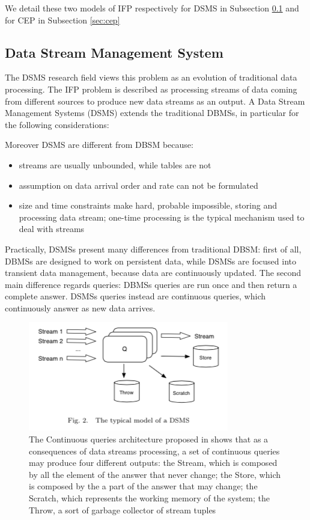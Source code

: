 We detail these two models of IFP respectively for DSMS in Subsection \ref{sec:dsms} and for CEP in Subsection \ref{sec:cep}

\subsection{Data Stream Management System}\label{sec:dsms}
The DSMS research field  views this problem as an evolution of traditional data processing. The IFP problem is described as processing streams of data coming from different sources to produce new data streams as an output. A Data Stream Management Systems (DSMS) extends the traditional DBMSs, in particular for the following considerations:

Moreover DSMS are different from DBSM because: 
\begin{itemize}
\item streams are usually unbounded, while tables are not
\item assumption on data arrival order and rate can not be formulated
\item size and time constraints make hard, probable impossible, storing and processing data stream; one-time processing is the typical mechanism used to deal with streams
\end{itemize} 

Practically, DSMSs present many differences from traditional DBSM: first of all, DBMSs are designed to work on persistent data, while DSMSs are focused into transient data management, because data are continuously updated. The second main difference regards queries: DBMSs queries are run once and then return a complete answer. DSMSs queries instead are continuous queries, which continuously answer as new data arrives. 

\begin{figure}[tbh]
  \centering
	\includegraphics[width=0.75\linewidth]{images/dsms}
	\caption[General Continuous Queries Architecture]{The Continuous queries architecture proposed in \cite{Babu:2001:CQO:603867.603884} shows that as a consequences of data streams processing, a set of continuous queries may produce four different outputs: the Stream, which is composed by all the element of the answer that never change; the Store, which is composed by the a part of the answer that may change; the Scratch, which represents the working memory of the system; the Throw, a sort of garbage collector of stream tuples} 
  	\label{fig:dsms}
\end{figure}

